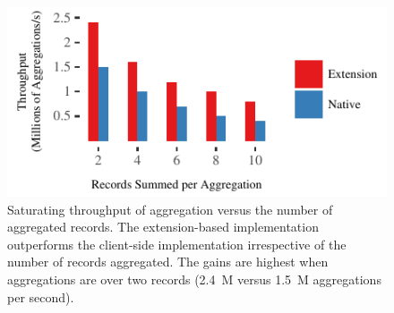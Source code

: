 \begin{figure}[t]
\centering
\includegraphics[width=1.0\columnwidth]{graphs/aggregate-sum-throughput.pdf}
  \caption{Saturating throughput of aggregation versus the
    number of aggregated records. The extension-based implementation
    outperforms the client-side implementation irrespective of the
    number of records aggregated. The gains are highest when
    aggregations are over two records (2.4~M versus 1.5~M aggregations per second).}
\label{fig:aggregate-sum-sizes}
\end{figure}
